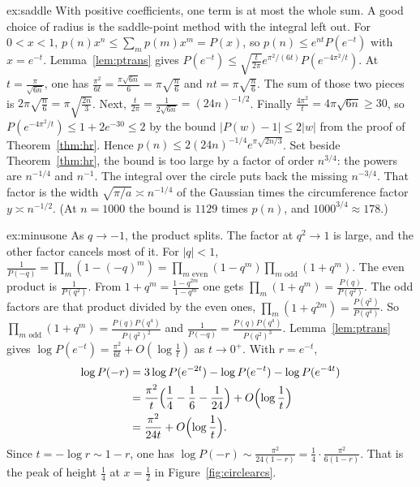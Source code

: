 \begin{solution}{ex:saddle}
\idea With positive coefficients, one term is at most the whole sum. A good choice of radius is the saddle-point method with the integral left out.
\writeup For $0<x<1$, $p(n)x^n\le\sum_mp(m)x^m=P(x)$, so $p(n)\le e^{nt}P(e^{-t})$ with $x=e^{-t}$. Lemma~\ref{lem:ptrans} gives $P(e^{-t})\le\sqrt{\frac t{2\pi}}e^{\pi^2/(6t)}P(e^{-4\pi^2/t})$. At $t=\frac\pi{\sqrt{6n}}$, one has $\frac{\pi^2}{6t}=\frac{\pi\sqrt{6n}}6=\pi\sqrt{\frac n6}$ and $nt=\pi\sqrt{\frac n6}$. The sum of those two pieces is $2\pi\sqrt{\frac n6}=\pi\sqrt{\frac{2n}3}$. Next, $\frac t{2\pi}=\frac1{2\sqrt{6n}}=(24n)^{-1/2}$. Finally $\frac{4\pi^2}t=4\pi\sqrt{6n}\ge30$, so $P(e^{-4\pi^2/t})\le1+2e^{-30}\le2$ by the bound $|P(w)-1|\le2|w|$ from the proof of Theorem~\ref{thm:hr}. Hence $p(n)\le2(24n)^{-1/4}e^{\pi\sqrt{2n/3}}$. Set beside Theorem~\ref{thm:hr}, the bound is too large by a factor of order $n^{3/4}$: the powers are $n^{-1/4}$ and $n^{-1}$. The integral over the circle puts back the missing $n^{-3/4}$. That factor is the width $\sqrt{\pi/a}\asymp n^{-1/4}$ of the Gaussian times the circumference factor $y\asymp n^{-1/2}$. (At $n=1000$ the bound is $1129$ times $p(n)$, and $1000^{3/4}\approx178$.)
\end{solution}

\begin{solution}{ex:minusone}
\idea As $q\to-1$, the product splits. The factor at $q^2\to1$ is large, and the other factor cancels most of it.
\writeup For $|q|<1$, $\frac1{P(-q)}=\prod_m(1-(-q)^m)=\prod_{m\text{ even}}(1-q^m)\prod_{m\text{ odd}}(1+q^m)$. The even product is $\frac1{P(q^2)}$. From $1+q^m=\frac{1-q^{2m}}{1-q^m}$ one gets $\prod_m(1+q^m)=\frac{P(q)}{P(q^2)}$. The odd factors are that product divided by the even ones, $\prod_m(1+q^{2m})=\frac{P(q^2)}{P(q^4)}$. So $\prod_{m\text{ odd}}(1+q^m)=\frac{P(q)P(q^4)}{P(q^2)^2}$ and $\frac1{P(-q)}=\frac{P(q)P(q^4)}{P(q^2)^3}$.
Lemma~\ref{lem:ptrans} gives $\log P(e^{-t})=\frac{\pi^2}{6t}+O(\log\frac1t)$ as $t\to0^+$. With $r=e^{-t}$,
\[
\begin{aligned}\log P(-r)&=3\log P(e^{-2t})-\log P(e^{-t})-\log P(e^{-4t})\\&=\frac{\pi^2}t\Bigl(\frac14-\frac16-\frac1{24}\Bigr)+O\Bigl(\log\frac1t\Bigr)\\&=\frac{\pi^2}{24t}+O\Bigl(\log\frac1t\Bigr).\end{aligned}
\]
Since $t=-\log r\sim1-r$, one has $\log P(-r)\sim\frac{\pi^2}{24(1-r)}=\frac14\cdot\frac{\pi^2}{6(1-r)}$. That is the peak of height $\frac14$ at $x=\frac12$ in Figure~\ref{fig:circlearcs}.
\end{solution}

